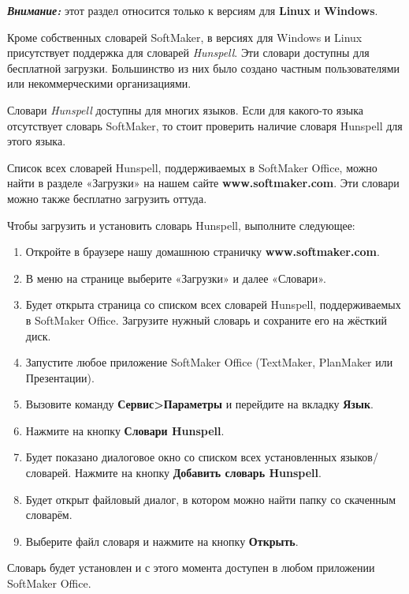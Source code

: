 ﻿\documentclass[a4paper,10pt]{article}
\begin{document}
 \begin{mdframed}[backgroundcolor=blue!10]
\textbf{\textit{Внимание:}} этот раздел относится только к версиям для \textbf{Linux} и \textbf{Windows}.
\end{mdframed}
 
Кроме собственных словарей SoftMaker, в версиях для Windows и Linux присутствует поддержка для словарей \textit{Hunspell}. Эти словари доступны для бесплатной загрузки. Большинство из них было создано частным пользователями или некоммерческими организациями.
 
 Словари \textit{Hunspell} доступны для многих языков. Если для какого-то языка отсутствует словарь SoftMaker, то стоит проверить наличие словаря Hunspell для этого языка.
 
 Список всех словарей Hunspell, поддерживаемых в SoftMaker Office, можно найти в разделе «Загрузки» на нашем сайте \textbf{www.softmaker.com}. Эти словари можно также бесплатно загрузить оттуда.
 
 Чтобы загрузить и установить словарь Hunspell, выполните следующее:
 
 \begin{enumerate}
  \item Откройте в браузере нашу домашнюю страничку \textbf{www.softmaker.com}.
  \item В меню на странице выберите «Загрузки» и далее «Словари».
  \item Будет открыта страница со списком всех словарей Hunspell, поддерживаемых в SoftMaker Office. Загрузите нужный словарь и сохраните его на жёсткий диск.
  \item Запустите любое приложение SoftMaker Office (TextMaker, PlanMaker или Презентации).
  \item Вызовите команду \textbf{Сервис>Параметры} и перейдите на вкладку \textbf{Язык}.
  \item Нажмите на кнопку \textbf{Словари Hunspell}.
  \item Будет показано диалоговое окно со списком всех установленных языков/словарей. Нажмите на кнопку \textbf{Добавить словарь Hunspell}.
  \item Будет открыт файловый диалог, в котором можно найти папку со скаченным словарём.
  \item Выберите файл словаря и нажмите на кнопку \textbf{Открыть}.
 \end{enumerate}

 Словарь будет установлен и с этого момента доступен в любом приложении SoftMaker Office.
 
\end{document}

